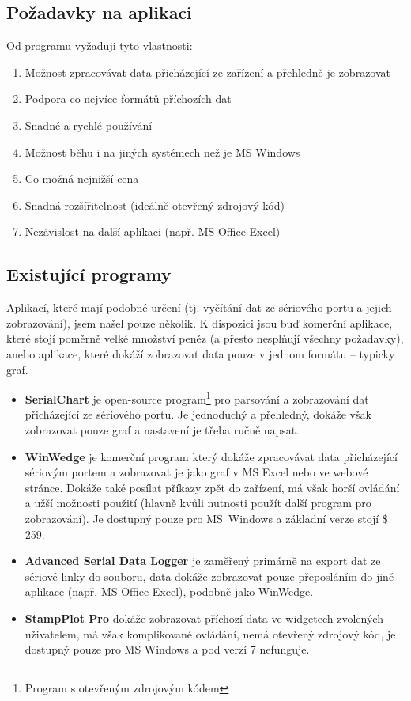 \documentclass[12pt, a4paper, oneside]{article}
\begin{document}
\subsection{Požadavky na aplikaci}
\label{reqs}
Od programu vyžaduji tyto vlastnosti:
\begin{enumerate}
    \item Možnost zpracovávat data přicházející ze zařízení a přehledně je zobrazovat %
    \item Podpora co nejvíce formátů příchozích dat %
    \item Snadné a rychlé používání %
    \item Možnost běhu i na jiných systémech než je MS Windows %
    \item Co možná nejnižší cena %
    \item Snadná rozšířitelnost (ideálně otevřený zdrojový kód) %
    \item Nezávislost na další aplikaci (např. MS Office Excel) %
\end{enumerate}

\subsection{Existující programy}
Aplikací, které mají podobné určení (tj. vyčítání dat ze sériového portu a jejich zobrazování), jsem našel pouze několik. K dispozici jsou buď komerční aplikace, které stojí poměrně velké množství peněz (a přesto nesplňují všechny požadavky), anebo aplikace, které dokáží zobrazovat data pouze v jednom formátu -- typicky graf.

\begin{itemize}
    \item {\bf SerialChart}\cite{serialchart} je open-source program\footnote{Program s otevřeným zdrojovým kódem} pro parsování a zobrazování dat přicházející ze sériového portu. Je jednoduchý a přehledný, dokáže však zobrazovat pouze graf a nastavení je třeba ručně napsat.
    \item {\bf WinWedge}\cite{winwedge} je komerční program který dokáže zpracovávat data přicházející sériovým portem a zobrazovat je jako graf v MS Excel nebo ve webové stránce. Dokáže také posílat příkazy zpět do zařízení, má však horší ovládání a užší možnosti použití (hlavně kvůli nutnosti použít další program pro zobrazování). Je dostupný pouze pro MS~Windows a základní verze stojí \$ 259.
    \item {\bf Advanced Serial Data Logger}\cite{serialdatalogger} je zaměřený primárně na export dat ze sériové linky do souboru, data dokáže zobrazovat pouze přeposláním do jiné aplikace (např. MS Office Excel), podobně jako WinWedge.
    \item {\bf StampPlot Pro}\cite{stamplot} dokáže zobrazovat příchozí data ve widgetech zvolených uživatelem, má však komplikované ovládání, nemá otevřený zdrojový kód, je dostupný pouze pro MS Windows a pod verzí 7 nefunguje.
\end{itemize}
\end{document}
